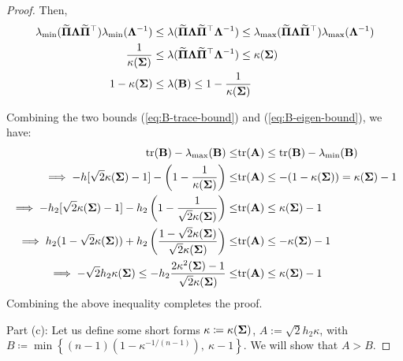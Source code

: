 \documentclass[numsec,webpdf,modern,medium,namedate]{oup-authoring-template}
\theoremstyle{thmstyleone}%
\theoremstyle{thmstyletwo}%
\theoremstyle{thmstylethree}%
\begin{document}
\begin{proof}
Then, 
\begin{equation}\label{eq:B-eigen-bound}
\begin{split}
\lambda_{\min}(\widetilde{{\boldsymbol{\Pi}}}\boldsymbol{\Lambda} \widetilde{{\boldsymbol{\Pi}}}^\top)\lambda_{\min}(\boldsymbol{\Lambda}^{-1}) & \leq \lambda(\widetilde{{\boldsymbol{\Pi}}}\boldsymbol{\Lambda} \widetilde{{\boldsymbol{\Pi}}}^\top \boldsymbol{\Lambda}^{-1})  \leq \lambda_{\max}(\widetilde{{\boldsymbol{\Pi}}}\boldsymbol{\Lambda} \widetilde{{\boldsymbol{\Pi}}}^\top)\lambda_{\max}(\boldsymbol{\Lambda}^{-1}) \\
\dfrac{1}{\kappa({\boldsymbol{\Sigma}})} & \leq \lambda(\widetilde{{\boldsymbol{\Pi}}}\boldsymbol{\Lambda} \widetilde{{\boldsymbol{\Pi}}}^\top \boldsymbol{\Lambda}^{-1}) \leq \kappa({\boldsymbol{\Sigma}})\\
1- \kappa({\boldsymbol{\Sigma}}) &\leq \lambda(\mathbf{B}) \leq 1 - \dfrac{1}{\kappa({\boldsymbol{\Sigma}})} 
\end{split}
\end{equation}

Combining the two bounds (\ref{eq:B-trace-bound}) and (\ref{eq:B-eigen-bound}), we have:
$$
\begin{aligned}
    \mathrm{tr}(\mathbf{B}) - \lambda_{\max}(\mathbf{B})\leq & \mathrm{tr}(\mathbf{A})\leq \mathrm{tr}(\mathbf{B}) - \lambda_{\min}(\mathbf{B})\\
    \implies -h[\sqrt{2}\kappa({\boldsymbol{\Sigma}})-1] - \left(1 - \frac{1}{\kappa({\boldsymbol{\Sigma}})}\right) \leq & \mathrm{tr}(\mathbf{A}) \leq -(1 - \kappa({\boldsymbol{\Sigma}})) = \kappa({\boldsymbol{\Sigma}}
    ) - 1\\
   \implies  -h_2[\sqrt{2}\kappa({\boldsymbol{\Sigma}})-1] - h_2\left(1 - \frac{1}{\sqrt{2}\kappa({\boldsymbol{\Sigma}})}\right) \leq & \mathrm{tr}(\mathbf{A}) \leq\kappa({\boldsymbol{\Sigma}}
    ) - 1 \\
    \implies h_2(1 - \sqrt{2}\kappa({\boldsymbol{\Sigma}})) + h_2\left(  \frac{1 - \sqrt{2}\kappa({\boldsymbol{\Sigma}})}{\sqrt{2}\kappa({\boldsymbol{\Sigma}})}\right) \leq & \mathrm{tr}(\mathbf{A}) \leq -\kappa({\boldsymbol{\Sigma}}
    ) - 1\\
    \implies -\sqrt{2}h_2\kappa(\boldsymbol{\Sigma})\leq  -h_2\frac{2\kappa^2({\boldsymbol{\Sigma}}) - 1}{\sqrt{2}\kappa({\boldsymbol{\Sigma}})}\leq & \mathrm{tr}(\mathbf{A}) \leq \kappa({\boldsymbol{\Sigma}}
    ) - 1\\
\end{aligned}
$$
Combining the above inequality completes the proof.

{Part (c):}
Let us define some short forms $\kappa \coloneqq \kappa(\boldsymbol{\Sigma})$, $A := \sqrt{2}h_2 \kappa$, with $B \coloneqq \min \left\{ (n-1)\left(1-\kappa^{-1/(n-1)}\right), \ \kappa-1 \right\}.$ We will show that $ A>B$.


\end{proof}
\end{document}
